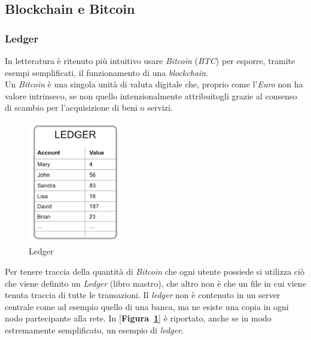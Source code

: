 \documentclass[11pt]{thesistemp}
\begin{document}
\subsection{Blockchain e Bitcoin}

\subsubsection{Ledger}
In letteratura è ritenuto più intuitivo usare \textit{Bitcoin} (\textit{BTC}) per esporre, tramite esempi semplificati, il funzionamento di una \textit{blockchain}.\\
Un \textit{Bitcoin} è una singola unità di valuta digitale che, proprio come l'\textit{Euro} non ha valore intrinseco, se non quello intenzionalmente attribuitogli grazie al consenso di scambio per l'acquisizione di beni o servizi.\\
\begin{figure}
	\vspace{-31pt}
	\begin{center}
    	\includegraphics[width=0.37\textwidth]{ledger.png}
  	\end{center}
  	\vspace{-10pt}
  	\caption{Ledger}
  	\label{fig:ledger}
  	\vspace{-30pt}
\end{figure}
Per tenere traccia della quantità di \textit{Bitcoin} che ogni utente possiede si utilizza ciò che viene definito un \textit{Ledger} (libro mastro), che altro non è che un file in cui viene tenuta traccia di tutte le transazioni.
Il \textit{ledger} non è contenuto in un server centrale come ad esempio quello di una banca, ma ne esiste una copia in ogni nodo partecipante alla rete. In [\textbf{Figura~\ref{fig:ledger}}] è riportato, anche se in modo estremamente semplificato, un esempio di \textit{ledger}. 
\end{document}
